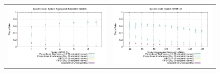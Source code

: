 \documentclass[conference]{IEEEtran}
\begin{document}
\begin{figure}[t]
\begin{tabular}{C{.5\linewidth}C{.5\linewidth}}
\includegraphics[width=\linewidth]{sim/figures/synthetic-080gbs-waste-celio.pdf} & \includegraphics[width=\linewidth]{sim/figures/synthetic-02hMTBF-waste-celio.pdf} \\

\end{tabular}
\end{figure}
\end{document}
